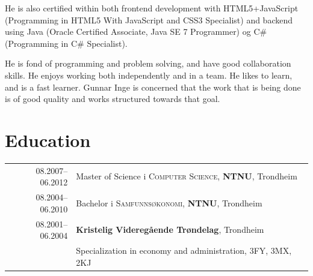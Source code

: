 \documentclass[a4paper,10pt]{article}
\begin{document}
He is also certified within both frontend development with
HTML5+JavaScript (Programming in HTML5 With JavaScript and CSS3
Specialist) and backend using Java (Oracle Certified Associate, Java
SE 7 Programmer) og C\# (Programming in C\# Specialist).

He is fond of programming and problem solving, and have good
collaboration skills.  He enjoys working both independently and in a
team. He likes to learn, and is a fast learner.  Gunnar Inge is
concerned that the work that is being done is of good quality and
works structured towards that goal.

\section{Education}
\begin{longtable}[l]{rl}	
 \textsc{08.2007--06.2012} & Master of Science i \textsc{Computer Science}, \textbf{NTNU}, Trondheim\\

 \textsc{08.2004--06.2010} & Bachelor i \textsc{Samfunns\o konomi}, \textbf{NTNU}, Trondheim\\

 \textsc{08.2001--06.2004}      & \textbf{Kristelig Videreg\aa ende Tr\o ndelag}, Trondheim\\
 & Specialization in economy and administration, 3FY, 3MX, 2KJ \\
\end{longtable}

\end{document}
